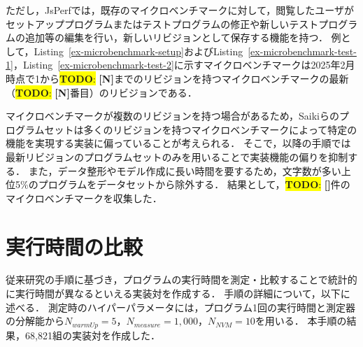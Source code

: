 \documentclass[11pt]{jreport}
\newcommand{\todo}[1]{\colorbox{yellow}{{\bf TODO}:}{\color{red} {\textbf{[#1]}}}}
\begin{document}
ただし，JsPerfでは，既存のマイクロベンチマークに対して，閲覧したユーザがセットアッププログラムまたはテストプログラムの修正や新しいテストプログラムの追加等の編集を行い，新しいリビジョンとして保存する機能を持つ．
例として，Listing~\ref{ex-microbenchmark-setup}およびListing~\ref{ex-microbenchmark-test-1}，Listing~\ref{ex-microbenchmark-test-2}に示すマイクロベンチマークは2025年2月時点で1から\todo{N}までのリビジョンを持つマイクロベンチマークの最新（\todo{N}番目）のリビジョンである．

マイクロベンチマークが複数のリビジョンを持つ場合があるため，Saikiら\cite{Saiki_2021}のプログラムセットは多くのリビジョンを持つマイクロベンチマークによって特定の機能を実現する実装に偏っていることが考えられる．
そこで，以降の手順では最新リビジョンのプログラムセットのみを用いることで実装機能の偏りを抑制する．
また，データ整形やモデル作成に長い時間を要するため，文字数が多い上位5\%のプログラムをデータセットから除外する．
結果として，\todo{}件のマイクロベンチマークを収集した．




\section{実行時間の比較}\label{chapter:dataset:measure}


従来研究\cite{Selakovic_2016}の手順に基づき，プログラムの実行時間を測定・比較することで統計的に実行時間が異なるといえる実装対を作成する．
手順の詳細について，以下に述べる．
測定時のハイパーパラメータには，プログラム1回の実行時間と測定器の分解能から\begin{math}N_{warmUp}=5\end{math}，\begin{math}N_{measure}=1,000\end{math}，\begin{math}N_{NVM}=10\end{math}を用いる．
本手順の結果，68,821組の実装対を作成した．
\end{document}

